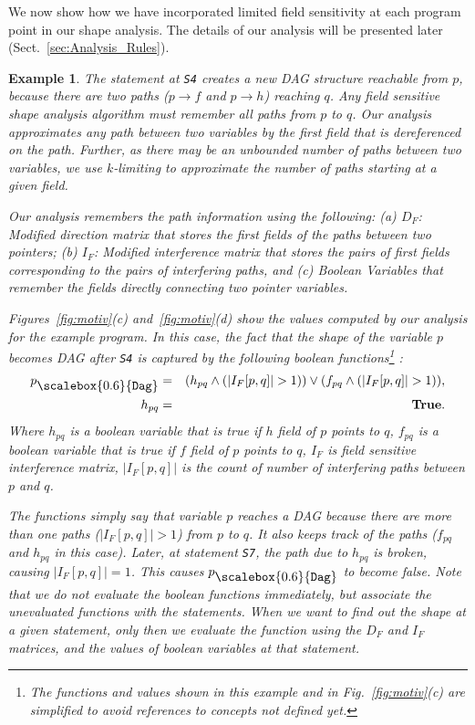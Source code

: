 \documentclass{sig-alternate}
\newtheorem{example}{Example}
\newcommand{\p}{\ensuremath{p}}
\newcommand{\q}{\ensuremath{q}}
\newcommand{\subD}{\mbox{\scalebox{0.6}{\Dag}}}
\newcommand{\num}[1]{\ensuremath{|#1|}}
\newcommand{\IFM}[2]{\ensuremath{I_F[#1,#2]}}
\newcommand{\Dag}{{\tt Dag}}
\newcommand{\true}{\textbf{True}}
\begin{document}
We now show how we have incorporated limited field
sensitivity at each program point  in our shape
analysis. The details of our analysis will be presented later
(Sect.~\ref{sec:Analysis_Rules}).

\begin{example}{\rm 
The statement at {\tt S4} creates a new DAG structure
reachable from $\p$, because there are two paths ($\p
\rightarrow f$ and $\p \rightarrow h$) reaching $\q$. Any
field sensitive shape analysis algorithm must remember all
paths from $\p$ to $\q$.  Our analysis approximates any
path between two variables by the first field that is
dereferenced on the path.  Further, as there may be an
unbounded number of paths between two variables, we use
$k$-limiting to approximate the number of paths starting at a
given field.

Our analysis remembers the path information using the
following: (a) $D_F$: Modified direction matrix that stores
the first fields of the paths between two pointers; (b)
$I_F$: Modified interference matrix that stores the pairs of
first fields corresponding to the pairs of interfering paths,
and (c) Boolean Variables that remember the fields directly
connecting two pointer variables.

Figures~\ref{fig:motiv}(c) and~\ref{fig:motiv}(d) show the
values computed by our analysis for the example program.  In
this case, the fact that the shape of the variable $\p$
becomes DAG after {\tt S4} is captured by the following
boolean functions\footnote{The functions and values shown in
  this example and in Fig.~\ref{fig:motiv}(c) are simplified
  to avoid references to concepts not defined yet.}
:
\begin{eqnarray*}
  p_{\subD} &=& (h_{pq} \wedge (\num{\IFM{p}{q}} > 1)) \vee
  (f_{pq} \wedge (\num{\IFM{p}{q}} > 1)), \\ 
  \qquad h_{pq} &=& \true.
\end{eqnarray*}
Where $h_{pq}$ is a boolean variable that is true if $h$
field of $\p$ points to $\q$, $f_{pq}$ is a boolean
variable that is true if $f$ field of $\p$ points to
$\q$, $I_F$ is field sensitive interference matrix,
$\num{I_F[p,q]}$ is the count of number of interfering paths
between $\p$ and $\q$. 

The functions simply say that variable $\p$ reaches a DAG
because there are more than one paths ($\num{I_F[p,q]} > 1$)
from $\p$ to $\q$. It also keeps track of the paths ($f_{pq}$
and $h_{pq}$ in this case).  Later, at statement {\tt S7},
the path due to $h_{pq}$ is broken, causing $\num{I_F[p,q]} =
1$. This causes $\p_{\subD}$ to become false.  Note that we
{\em do not} evaluate the boolean functions immediately, but
associate the unevaluated functions with the statements. When
we want to find out the shape at a given statement, only then
we evaluate the function using the $D_F$ and $I_F$ matrices,
and the values of boolean variables at that statement.

}
\end{example}
\end{document}
